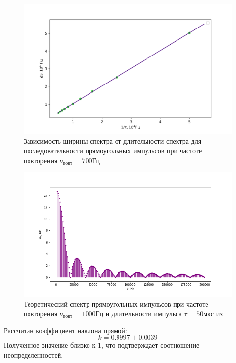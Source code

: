 \documentclass[a4paper,12pt]{article} %
\begin{document}
\begin{figure}[h!]
\begin{center}
\includegraphics[width=\textwidth]{dnu(tau)}
\caption{Зависимость ширины спектра от длительности спектра для последовательности прямоугольных импульсов при частоте повторения $\nu_{повт} = 700 Гц$} \label{dnu(tau)_img}
\end{center}
\end{figure}
\begin{figure}[h!]
\begin{center}
\includegraphics[width=\textwidth]{a(n)}
\caption{Теоретический спектр прямоугольных импульсов при частоте повторения $\nu_{повт} = 1000 Гц$ и длительности импульса $\tau = 50 мкс$ из \cite{labnik}} \label{теор}
\end{center}
\end{figure}
Рассчитан коэффициент наклона прямой:
\begin{equation}
k = 0.9997 \pm 0.0039
\end{equation}
Полученное значение близко к $1$, что подтверждает соотношение неопределенностей. 
\end{document}
